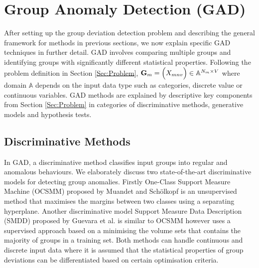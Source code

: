 \chapter{Group Anomaly Detection (GAD) }  
 \label{sec:staticGAD}
After setting up the group deviation detection  problem and describing the general framework for methods in previous sections, we now  explain specific GAD techniques in further detail. 
 GAD involves comparing multiple groups and identifying groups with significantly different statistical properties.  Following the problem definition in Section   \ref{Sec:Problem}, 
${\bf G}_m= \Big ( {X}_{mnv}\Big) \in \mathbb{A}^{N_m \times V}    $ 
where domain $\mathbb{A}$ depends on the   input data type such as  categories, discrete value or continuous variables.
 GAD methods are explained by descriptive key components from Section   \ref{Sec:Problem} in  categories of discriminative methods,  generative models and hypothesis tests. 



\section{ Discriminative Methods } 
 In GAD, a discriminative method classifies input groups into regular and anomalous behaviours.     
We  elaborately discuss two state-of-the-art discriminative models for detecting group anomalies.  Firstly One-Class Support Measure Machine (OCSMM)   proposed by Muandet and Sch\"olkopf \cite{OCSMM} %
is an unsupervised method that maximises the margins between two classes using a separating hyperplane.  
 Another discriminative model Support Measure Data Description (SMDD)   proposed by Guevara et al. \cite{SMDD} is similar to OCSMM however uses a supervised approach  based on a minimising the  volume sets that contains the majority of groups in a training set.  %
  Both methods can handle continuous and discrete input data where it is assumed that the statistical properties of group deviations can be differentiated based on certain  optimisation criteria. 
  
